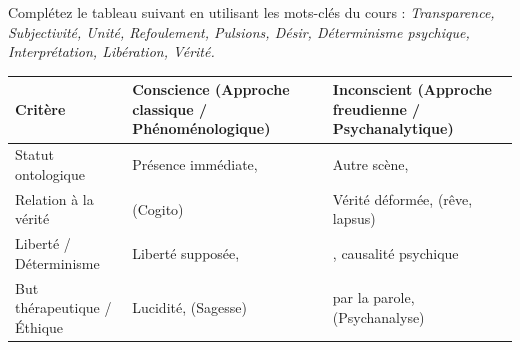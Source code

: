 \documentclass[11pt]{article}
\begin{document}
\begin{exercice}
Complétez le tableau suivant en utilisant les mots-clés du cours : \textit{Transparence, Subjectivité, Unité, Refoulement, Pulsions, Désir, Déterminisme psychique, Interprétation, Libération, Vérité.}
\begin{center}
\begin{tabular}{|p{3.5cm}|p{5.5cm}|p{5.5cm}|}
\hline
\textbf{Critère} & \textbf{Conscience (Approche classique / Phénoménologique)} & \textbf{Inconscient (Approche freudienne / Psychanalytique)} \\
\hline
Statut ontologique & Présence immédiate, \underline{\hspace{4cm}} & Autre scène, \underline{\hspace{4cm}} \\
\hline
Relation à la vérité & \underline{\hspace{4cm}} (Cogito) & Vérité déformée, \underline{\hspace{4cm}} (rêve, lapsus) \\
\hline
Liberté / Déterminisme & Liberté supposée, \underline{\hspace{4cm}} & \underline{\hspace{4cm}}, causalité psychique \\
\hline
But thérapeutique / Éthique & Lucidité, \underline{\hspace{4cm}} (Sagesse) & \underline{\hspace{4cm}} par la parole, \underline{\hspace{4cm}} (Psychanalyse) \\
\hline
\end{tabular}
\end{center}
\end{exercice}
\end{document}
